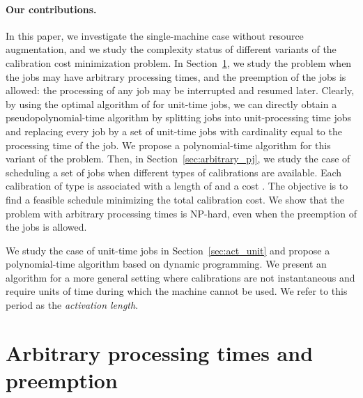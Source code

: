 \paragraph{Our contributions.} In this paper, we investigate the single-machine case without resource augmentation, and we study the complexity status of different variants of the calibration cost minimization problem. In Section~\ref{sec:warm}, we study the problem when the jobs may have arbitrary processing times, and the preemption of the jobs is allowed: the processing of any job may be interrupted and resumed later.  Clearly, by using the optimal algorithm of \cite{bender2013efficient} for unit-time jobs, we can directly obtain a pseudopolynomial-time algorithm by splitting jobs into unit-processing time jobs and replacing every job by a set of unit-time jobs with cardinality equal to the processing time of the job. We propose a polynomial-time algorithm for this variant of the problem.  Then, in Section~\ref{sec:arbitrary_pj}, we study the case of scheduling a set of jobs when  different types of calibrations are available. Each calibration of type  is associated with a length of  and a cost . The objective is to find a feasible schedule minimizing the total calibration cost. We show that the problem with arbitrary processing times is NP-hard, even when the preemption of the jobs is allowed. 



We study the case of unit-time jobs in Section~\ref{sec:act_unit} and propose a polynomial-time algorithm based on dynamic programming. We present an algorithm for a more general setting where calibrations are not instantaneous and require  units of time during which the machine cannot be used. We refer to this period as the \emph{activation length}. 







\section{Arbitrary processing times and preemption}\label{sec:warm}

